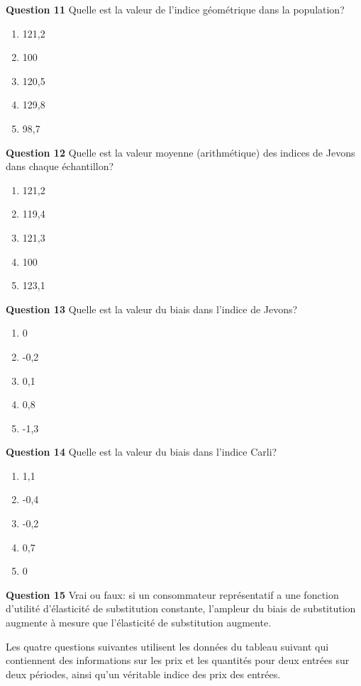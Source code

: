 \documentclass[
]{article}
\begin{document}
\textbf{Question 11} Quelle est la valeur de l'indice géométrique dans la population?

\begin{enumerate}
\def\labelenumi{\alph{enumi})}
\item
  121,2
\item
  100
\item
  120,5
\item
  129,8
\item
  98,7
\end{enumerate}

\textbf{Question 12} Quelle est la valeur moyenne (arithmétique) des indices de Jevons dans chaque échantillon?

\begin{enumerate}
\def\labelenumi{\alph{enumi})}
\item
  121,2
\item
  119,4
\item
  121,3
\item
  100
\item
  123,1
\end{enumerate}

\textbf{Question 13} Quelle est la valeur du biais dans l'indice de Jevons?

\begin{enumerate}
\def\labelenumi{\alph{enumi})}
\item
  0
\item
  -0,2
\item
  0,1
\item
  0,8
\item
  -1,3
\end{enumerate}

\textbf{Question 14} Quelle est la valeur du biais dans l'indice Carli?

\begin{enumerate}
\def\labelenumi{\alph{enumi})}
\item
  1,1
\item
  -0,4
\item
  -0,2
\item
  0,7
\item
  0
\end{enumerate}

\textbf{Question 15} Vrai ou faux: si un consommateur représentatif a une fonction d'utilité d'élasticité de substitution constante, l'ampleur du biais de substitution augmente à mesure que l'élasticité de substitution augmente.

Les quatre questions suivantes utilisent les données du tableau suivant qui contiennent des informations sur les prix et les quantités pour deux entrées sur deux périodes, ainsi qu'un véritable indice des prix des entrées.
\end{document}

